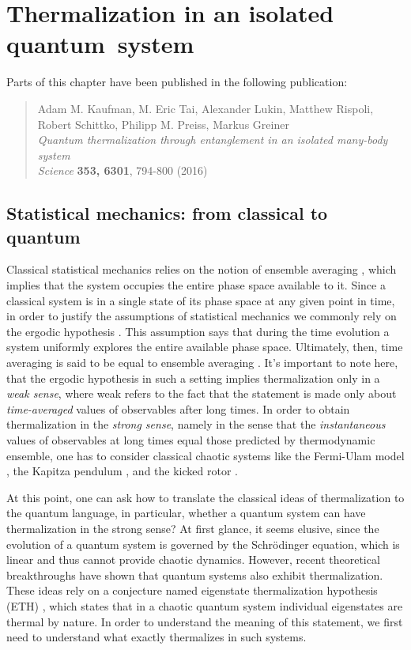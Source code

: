 
\chapter{Thermalization in an isolated quantum~system}

Parts of this chapter have been published in the following publication:

\begin{quote}
	{Adam M. Kaufman, M. Eric Tai, Alexander Lukin, Matthew Rispoli, \\ Robert Schittko, Philipp M. Preiss, Markus Greiner} \\
	\textit{Quantum thermalization through entanglement in an isolated many-body system}\\
	\textit{Science} \textbf{353, 6301}, 794-800 (2016)
\end{quote}


\section{Statistical mechanics: from  classical to quantum}

Classical statistical mechanics relies on the notion of ensemble averaging \cite{Chandler1987}, which implies that the system occupies the entire phase space available to it. Since a classical system is in a single state of its phase space at any given point in time, in order to justify the assumptions of statistical mechanics we commonly rely on the ergodic hypothesis \cite{Penrose1970}. This assumption says that during the time evolution a system uniformly explores the entire available phase space. Ultimately, then, time averaging is said to be equal to ensemble averaging \cite{Penrose1970}. It's important to note here, that the ergodic hypothesis in such a setting implies thermalization only in a \textit{weak sense}, where weak refers to the fact that the statement is made only about \textit{time-averaged} values of observables after long times. In order to obtain thermalization in the \textit{strong sense}, namely in the sense that the \textit{instantaneous} values of observables at long times equal those predicted by thermodynamic ensemble, one has to consider classical chaotic systems like the Fermi-Ulam model \cite{Lichtenberg1992}, the Kapitza pendulum \cite{Broer2004}, and the kicked rotor \cite{Chirikov1979}.

At this point, one can ask how to translate the classical ideas of thermalization to the quantum language, in particular, whether a quantum system can have thermalization in the strong sense? At first glance, it seems elusive, since the evolution of a quantum system is governed by the Schr\"odinger equation, which is linear and thus cannot provide chaotic dynamics. However, recent theoretical breakthroughs \cite{Deutsch1991, Srednicki1994, Rigol2008} have shown that quantum systems also exhibit thermalization. These ideas rely on a conjecture named eigenstate thermalization hypothesis (ETH) \cite{Srednicki1999}, which states that in a chaotic quantum system individual eigenstates are thermal by nature. In order to understand the meaning of this statement, we first need to understand what exactly thermalizes in such systems.

